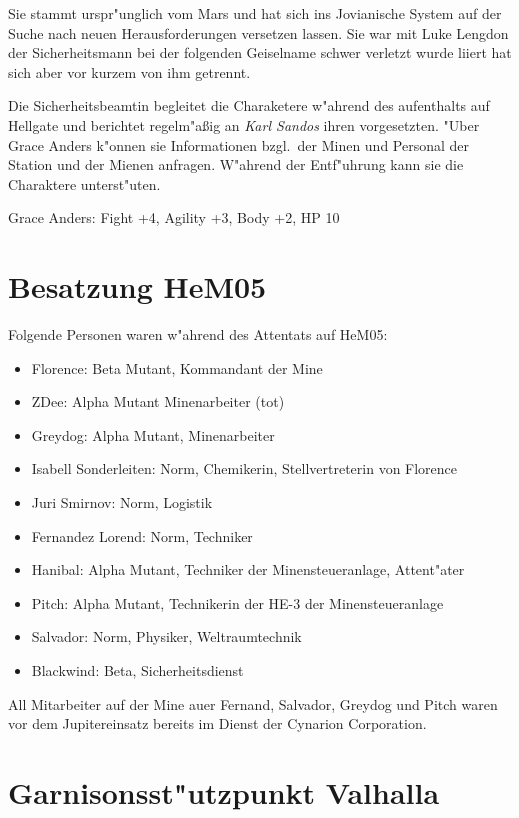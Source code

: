 Sie stammt urspr"unglich vom Mars und hat sich ins Jovianische System auf der Suche nach neuen Herausforderungen versetzen lassen. Sie war mit Luke Lengdon der Sicherheitsmann bei der folgenden Geiselname schwer verletzt wurde liiert hat sich aber vor kurzem von ihm getrennt.

Die Sicherheitsbeamtin begleitet die Charaketere w"ahrend des aufenthalts auf Hellgate und berichtet regelm"aßig an \emph{Karl Sandos} ihren vorgesetzten. "Uber Grace Anders k"onnen sie Informationen bzgl.~der Minen und Personal der Station und der Mienen anfragen. W"ahrend der Entf"uhrung kann sie die Charaktere unterst"uten.

Grace Anders: Fight +4, Agility +3, Body +2, HP 10

\section{Besatzung HeM05}

Folgende Personen waren w"ahrend des Attentats auf HeM05:

\begin{itemize}
    \item Florence: Beta Mutant, Kommandant der Mine    
    \item ZDee: Alpha Mutant Minenarbeiter (tot)
    \item Greydog: Alpha Mutant, Minenarbeiter
    \item Isabell Sonderleiten: Norm, Chemikerin, Stellvertreterin von Florence
    \item Juri Smirnov: Norm, Logistik
    \item Fernandez Lorend: Norm, Techniker
    \item Hanibal: Alpha Mutant, Techniker der Minensteueranlage, Attent"ater
    \item Pitch: Alpha Mutant, Technikerin der HE-3 der Minensteueranlage
    \item Salvador: Norm, Physiker, Weltraumtechnik
    \item Blackwind: Beta, Sicherheitsdienst
\end{itemize}

All Mitarbeiter auf der Mine au\3er Fernand, Salvador, Greydog und Pitch waren vor dem Jupitereinsatz bereits im Dienst der Cynarion Corporation.

\section{Garnisonsst"utzpunkt Valhalla}

